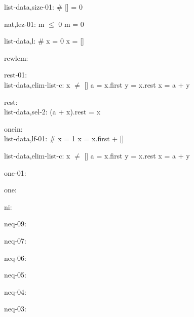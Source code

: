 \documentclass[a4paper]{article}
\begin{document}
list-data,size-01: 
 \Fol \# [] = 0



nat,lez-01: 
 \Fol m $\le$ 0 \Equiv m = 0



list-data,l: 
 \Fol \# x = 0 \Equiv x = []



\bigskip

rewlem:\\ 

\bigskip

rest-01:\\ list-data,elim-list-c: 
x $\neq$ []
 \Fol a = x.first \And y = x.rest \Equiv x = a + y



\bigskip

rest:\\ list-data,sel-2: 
 \Fol (a + x).rest = x



\bigskip

onein:\\ list-data,lf-01: 
 \Fol \# x = 1 \Equiv x = x.first + []



list-data,elim-list-c: 
x $\neq$ []
 \Fol a = x.first \And y = x.rest \Equiv x = a + y



\bigskip

one-01:\\ 

\bigskip

one:\\ 

\bigskip

ni:\\ 

\bigskip

neq-09:\\ 

\bigskip

neq-07:\\ 

\bigskip

neq-06:\\ 

\bigskip

neq-05:\\ 

\bigskip

neq-04:\\ 

\bigskip

neq-03:\\ 
\end{document}
